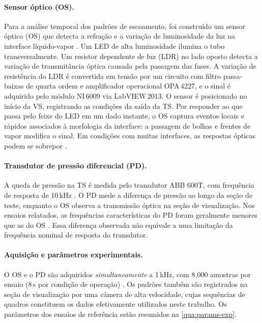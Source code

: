 \paragraph{Sensor óptico (OS).}
Para a análise temporal dos padrões de escoamento, foi construído um sensor óptico (OS)
que detecta a refração e a variação de luminosidade da luz na interface
líquido-vapor \cite{deoliveira2019}.
Um LED de alta luminosidade ilumina o tubo transversalmente. Um resistor dependente de luz
(LDR) no lado oposto detecta a variação de transmitância óptica causada pela passagem das
fases. A variação de resistência do LDR é convertida em tensão por um circuito com filtro
passa-baixas de quarta ordem e amplificador operacional OPA\,4227, e o sinal é adquirido
pelo módulo NI\,6009 via LabVIEW\,2013. O sensor é posicionado no início da VS, registrando
as condições da saída da TS. Por responder ao que passa pelo feixe do LED em um dado instante, 
o OS captura eventos locais e rápidos associados à morfologia da interface: a passagem de 
bolhas e frentes de vapor modifica o sinal. Em condições com muitas interfaces,
as respostas ópticas podem se sobrepor \cite{deoliveira2021}.

\paragraph{Transdutor de pressão diferencial (PD).}
A queda de pressão na TS é medida pelo transdutor ABB\texttrademark{} 600T, com frequência
de resposta de 10\,kHz \cite{deoliveira2021}. O PD mede a diferença de pressão ao
longo da seção de teste, enquanto o OS observa a transmissão óptica na seção de
visualização. Nos ensaios relatados, as frequências características do PD foram
geralmente menores que as do OS \cite{deoliveira2021}. Essa diferença observada
não equivale a uma limitação da frequência nominal de resposta do transdutor.

\paragraph{Aquisição e parâmetros experimentais.}
O OS e o PD são adquiridos \textit{simultaneamente} a 1\,kHz, com 8.000 amostras por
ensaio (8\,s por condição de operação) \cite{deoliveira2021}. Os padrões também são
registrados na seção de visualização por uma câmera de alta velocidade, cujas sequências de
quadros constituem os dados efetivamente utilizados neste trabalho. Os parâmetros dos
ensaios de referência estão resumidos na \autoref{qua:params-exp}.


